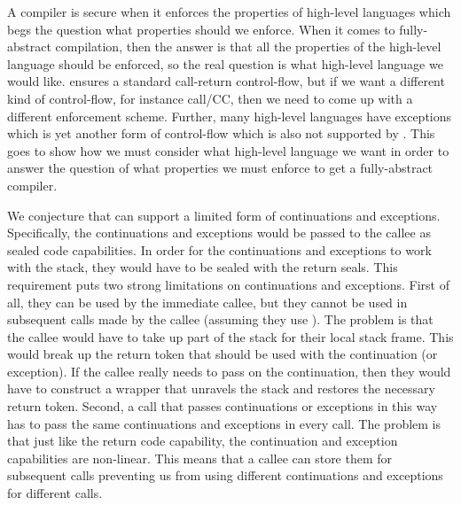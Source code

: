 

\begin{jversion}
  A compiler is secure when it enforces the properties of high-level languages which begs the question what properties should we enforce.
  When it comes to fully-abstract compilation, then the answer is that all the properties of the high-level language should be enforced, so the real question is what high-level language we would like.
  \stktokens{} ensures a standard call-return control-flow, but if we want a different kind of control-flow, for instance call/CC, then we need to come up with a different enforcement scheme.
  Further, many high-level languages have exceptions which is yet another form of control-flow which is also not supported by \stktokens{}.
  This goes to show how we must consider what high-level language we want in order to answer the question of what properties we must enforce to get a fully-abstract compiler.

  We conjecture that \stktokens{} can support a limited form of continuations and exceptions.
  Specifically, the continuations and exceptions would be passed to the callee as sealed code capabilities.
  In order for the continuations and exceptions to work with the stack, they would have to be sealed with the return seals.
  This requirement puts two strong limitations on continuations and exceptions.
  First of all, they can be used by the immediate callee, but they cannot be used in subsequent calls made by the callee (assuming they use \stktokens{}).
  The problem is that the callee would have to take up part of the stack for their local stack frame.
  This would break up the return token that should be used with the continuation (or exception).
  If the callee really needs to pass on the continuation, then they would have to construct a wrapper that unravels the stack and restores the necessary return token.
  Second, a call that passes continuations or exceptions in this way has to pass the same continuations and exceptions in every call.
  The problem is that just like the return code capability, the continuation and exception capabilities are non-linear.
  This means that a callee can store them for subsequent calls preventing us from using different continuations and exceptions for different calls.


\end{jversion}
